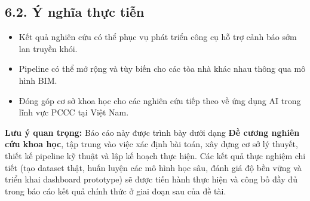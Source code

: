 \subsection*{6.2. Ý nghĩa thực tiễn}

\begin{itemize}
  \item Kết quả nghiên cứu có thể phục vụ phát triển công cụ hỗ trợ cảnh báo sớm lan truyền khói.
  \item Pipeline có thể mở rộng và tùy biến cho các tòa nhà khác nhau thông qua mô hình BIM.
  \item Đóng góp cơ sở khoa học cho các nghiên cứu tiếp theo về ứng dụng AI trong lĩnh vực PCCC tại Việt Nam.
\end{itemize}

\vspace{12pt}
\begin{notebox}
\textbf{Lưu ý quan trọng:} Báo cáo này được trình bày dưới dạng \textbf{Đề cương nghiên cứu khoa học}, tập trung vào việc xác định bài toán, xây dựng cơ sở lý thuyết, thiết kế pipeline kỹ thuật và lập kế hoạch thực hiện. Các kết quả thực nghiệm chi tiết (tạo dataset thật, huấn luyện các mô hình học sâu, đánh giá độ bền vững và triển khai dashboard prototype) sẽ được tiến hành thực hiện và công bố đầy đủ trong báo cáo kết quả chính thức ở giai đoạn sau của đề tài.
\end{notebox}
